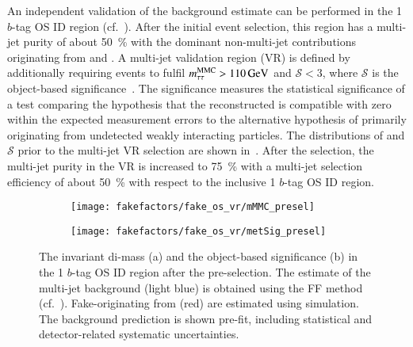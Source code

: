 An independent validation of the background estimate can be performed in the 1
$b$-tag OS ID region (cf.\ ). After the initial
event selection, this region has a multi-jet purity of about \SI{50}{\percent}
with the dominant non-multi-jet contributions originating from \Zjets and
\ttbar. A multi-jet validation region (VR) is defined by additionally requiring
events to fulfil $m_{\tau\tau}^\text{MMC} > \SI{110}{\ensuremath{\text{GeV}}}$ and $\mathcal{S} < 3$,
where $\mathcal{S}$ is the object-based \pTmissAbs
significance~\cite{ATLAS-CONF-2018-038}. The \pTmissAbs significance measures
the statistical significance of a test comparing the hypothesis that the
reconstructed \pTmissAbs is compatible with zero within the expected measurement
errors to the alternative hypothesis of \pTmissAbs primarily originating from
undetected weakly interacting particles. The distributions of \mMMC and
$\mathcal{S}$ prior to the multi-jet VR selection are shown
in~. After the selection, the multi-jet
purity in the VR is increased to \SI{75}{\percent} with a multi-jet selection
efficiency of about \SI{50}{\percent} with respect to the inclusive 1 $b$-tag OS
ID region.


\begin{figure}[htbp]
  \centering

  \begin{subfigure}{0.44\textwidth}
    \texttt{[image: fakefactors/fake\_os\_vr/mMMC\_presel]}
    \subcaption{}
  \end{subfigure}\hspace*{0.04\textwidth}%
  \begin{subfigure}{0.44\textwidth}
    \texttt{[image: fakefactors/fake\_os\_vr/metSig\_presel]}
    \subcaption{}
  \end{subfigure}

  \caption{The invariant di-\tauhad mass (a) and the object-based \pTmissAbs
    significance (b) in the 1 $b$-tag OS ID region after the pre-selection. The
    estimate of the multi-jet background (light blue) is obtained using the FF
    method (cf.\ ). Fake-\tauhadvis originating
    from \ttbar (red) are estimated using simulation. The background prediction
    is shown pre-fit, including statistical and detector-related systematic
    uncertainties.}
  \label{fig:fake_factor_OSVR_cutvars}
\end{figure}

